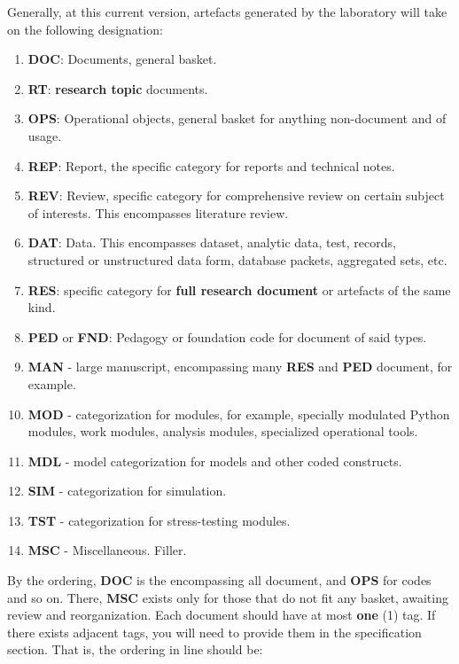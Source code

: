 \documentclass[9pt,a4paper]{article}
\begin{document}
Generally, at this current version, artefacts generated by the laboratory will take on the following designation:
\begin{enumerate}
    \item \textbf{DOC}: Documents, general basket. 
    \item \textbf{RT}: \textbf{research topic} documents. 
    \item \textbf{OPS}: Operational objects, general basket for anything non-document and of usage. 
    \item \textbf{REP}: Report, the specific category for reports and technical notes. 
    \item \textbf{REV}: Review, specific category for comprehensive review on certain subject of interests. This encompasses literature review. 
    \item \textbf{DAT}: Data. This encompasses dataset, analytic data, test, records, structured or unstructured data form, database packets, aggregated sets, etc. 
    \item \textbf{RES}: specific category for \textbf{full research document} or artefacts of the same kind.
    \item \textbf{PED} or \textbf{FND}: Pedagogy or foundation code for document of said types. 
    \item \textbf{MAN} - large manuscript, encompassing many \textbf{RES} and \textbf{PED} document, for example. 
    \item \textbf{MOD} - categorization for modules, for example, specially modulated Python modules, work modules, analysis modules, specialized operational tools. 
    \item \textbf{MDL} - model categorization for models and other coded constructs. 
    \item \textbf{SIM} - categorization for simulation. 
    \item \textbf{TST} - categorization for stress-testing modules. 
    \item \textbf{MSC} - Miscellaneous. Filler.
\end{enumerate}

By the ordering, \textbf{DOC} is the encompassing all document, and \textbf{OPS} for codes and so on. There, \textbf{MSC} exists only for those that do not fit any basket, awaiting review and reorganization. Each document should have at most \textbf{one} (1) tag. If there exists adjacent tags, you will need to provide them in the specification section. That is, the ordering in line should be:
\end{document}
